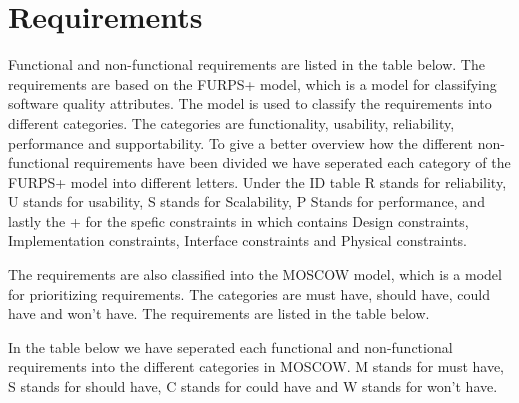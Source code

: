 
\section{Requirements}

Functional and non-functional\cite{example} requirements are listed in the table below. The requirements are based on the FURPS+ model, which is a model for classifying software quality attributes. The model is used to classify the requirements into different categories. The categories are functionality, usability, reliability, performance and supportability.
To give a better overview how the different non-functional requirements have been divided we have seperated each category of the FURPS+ model into different letters. Under the ID table R stands for reliability, U stands for usability, S stands for Scalability, P Stands for performance, and lastly the + for the spefic constraints in which contains Design constraints, Implementation constraints, Interface constraints and Physical constraints. \newline

The requirements are also classified into the MOSCOW model, which is a model for prioritizing requirements. The categories are must have, should have, could have and won't have. The requirements are listed in the table below. \newline

In the table below we have seperated each functional and non-functional requirements into the different categories in MOSCOW. M stands for must have, S stands for should have, C stands for could have and W stands for won't have.\newline

